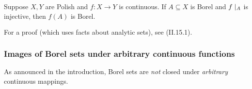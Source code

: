 \begin{theorem}\label{thm-borel-injective}Suppose $X,Y$ are Polish and $f:X \to Y$ is continuous. If $A \subseteq X$ is Borel and $f\mid_{A}$ is injective, then $f(A)$ is Borel.

\end{theorem}For a proof (which uses facts about analytic sets), see \cite{Kechris:1995a} (II.15.1).

\subsubsection{Images of Borel sets under arbitrary continuous functions}

As announced in the introduction, Borel sets are \textit{not} closed under \textit{arbitrary} continuous mappings.

